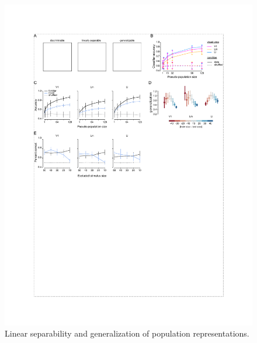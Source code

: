 \begin{figure}[t!]
    \includegraphics[width=\textwidth]{figures/chapter_4/fig_4-2_neural_generalization/fig_4-2_neural_generalization.pdf}
    \vspace{.1in}
    \caption[Population representations of objects]{Linear separability and generalization of population representations. 
}
\end{figure}
